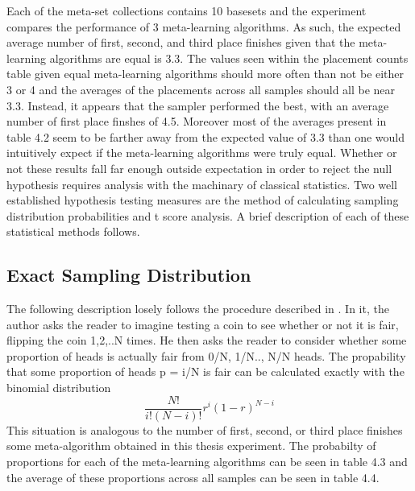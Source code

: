 Each of the meta-set collections contains 10 basesets and the experiment
compares the performance of 3 meta-learning algorithms. As such, the expected
average number of first, second, and third place finishes given that the
meta-learning algorithms are equal is 3.3. The values seen within the placement
counts table given equal meta-learning algorithms should more often than not be
either 3 or 4 and the averages of the placements across all samples should all
be near 3.3. Instead, it appears that the sampler performed the best,
with an average number of first place finshes of 4.5. Moreover most of the
averages present in table 4.2 seem to be farther away from the expected value of
3.3 than one would intuitively expect if the meta-learning algorithms were
truly equal. Whether or not these results fall far enough outside
expectation in order to reject the null hypothesis requires analysis with the
machinary of classical statistics. Two well established hypothesis testing
measures are the method of calculating sampling distribution probabilities and
t score analysis. A brief description of each of these statistical methods
follows.

\subsection{Exact Sampling Distribution}
The following description losely follows the procedure described in \cite{Cohen}.
In it, the author asks the reader to imagine testing a coin to see whether or
not it is fair, flipping the coin 1,2,..N times. He then asks the reader to
consider whether some proportion of heads is actually fair from 0/N, 1/N.., N/N
heads. The propability that some proportion of heads p = i/N is fair can be
calculated exactly with the binomial distribution
$$\frac{N!}{i!(N-i)!}r^{i}(1-r)^{N-i}$$
This situation is analogous to the number of first, second, or third place
finishes some meta-algorithm obtained in this thesis experiment. The probabilty
of proportions for each of the meta-learning algorithms can be seen in table 4.3
and the average of these proportions across all samples can be seen in table 4.4.

